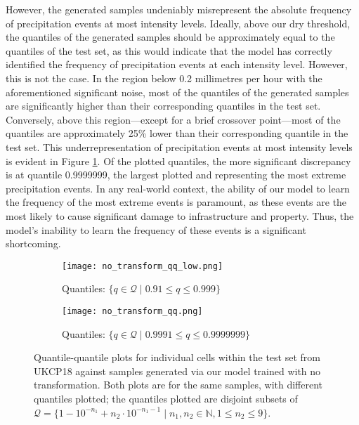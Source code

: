 \documentclass[ oneside,%
                    author={George Herbert},
                    degree={MSci},
                     title={Video Diffusion Models for Climate Simulations},
                  subtitle={}]{dissertation}
\begin{document}
However, the generated samples undeniably misrepresent the absolute frequency of precipitation events at most intensity levels. Ideally, above our dry threshold, the quantiles of the generated samples should be approximately equal to the quantiles of the test set, as this would indicate that the model has correctly identified the frequency of precipitation events at each intensity level. However, this is not the case. In the region below 0.2 millimetres per hour with the aforementioned significant noise, most of the quantiles of the generated samples are significantly higher than their corresponding quantiles in the test set. Conversely, above this region---except for a brief crossover point---most of the quantiles are approximately 25\% lower than their corresponding quantile in the test set. This underrepresentation of precipitation events at most intensity levels is evident in Figure \ref{fig:no_transform_qq}. Of the plotted quantiles, the more significant discrepancy is at quantile 0.9999999, the largest plotted and representing the most extreme precipitation events. In any real-world context, the ability of our model to learn the frequency of the most extreme events is paramount, as these events are the most likely to cause significant damage to infrastructure and property. Thus, the model's inability to learn the frequency of these events is a significant shortcoming.

\begin{figure}[htbp]
      \centering
      \begin{subfigure}{0.485\textwidth}
            \texttt{[image: no\_transform\_qq\_low.png]}
            \caption{Quantiles: $\{q\in\mathcal{Q}\mid 0.91 \le q \le 0.999 \}$}
      \end{subfigure}
      \begin{subfigure}{0.495\textwidth}
            \texttt{[image: no\_transform\_qq.png]}
            \caption{Quantiles: $\{q\in\mathcal{Q}\mid 0.9991 \le q \le 0.9999999 \}$}
      \end{subfigure}
      \caption{Quantile-quantile plots for individual cells within the test set from UKCP18 against samples generated via our model trained with no transformation. Both plots are for the same samples, with different quantiles plotted; the quantiles plotted are disjoint subsets of $\mathcal{Q} = \{1 - 10^{-n_1} + n_2 \cdot 10^{-n_1 - 1}\mid n_1,n_2\in \mathbb{N}, 1 \le n_2 \le 9\}$.}
      \label{fig:no_transform_qq}
\end{figure}
\end{document}
